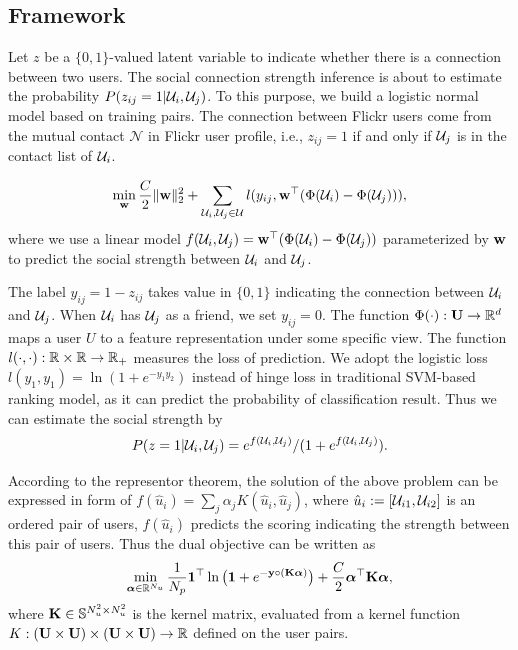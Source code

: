 \subsection{Framework}

Let $z$ be a $\{0, 1\}$-valued latent variable to indicate whether there is a connection between two users. The social connection strength inference is about to
estimate the probability $P(z_{ij}=1|{\cal U}_i, {\cal U}_j)$. To this purpose, we build a logistic normal model based on training pairs. The connection between Flickr
users come from the mutual contact $\mathcal N$ in Flickr user profile, i.e., $z_{ij}=1 $ if and only if ${\cal U}_j$ is in the contact list of ${\cal U}_i$.

\begin{eqnarray}
\min_{\w} \frac{C}{2}\| \w \|_2^2 + \sum_{\u_i, \u_j \in \mathcal U}l(y_{ij}, \w^\top(\Phi(\u_i) - \Phi(\u_j))), \label{eqn:primal-obj}
\end{eqnarray}
where we use a linear model $f({\cal U}_i, {\cal U}_j) = {\mathbf w}^\top(\Phi({\cal U}_i) - \Phi({\cal U}_j))$ parameterized by ${\mathbf w}$ to predict the social strength between ${\cal U}_i$ and ${\cal U}_j$.

The label $y_{ij} = 1 - z_{ij}$ takes value in $\{0, 1\}$ indicating the connection between ${\cal U}_i$ and ${\cal U}_j$. When ${\cal U}_i$ has ${\cal U}_j$ as a friend, we set
$y_{ij}= 0$. The function $\Phi(\cdot):{\bf U}\rightarrow{\mathbb R}^d$ maps a user $U$ to a feature representation under some specific view. The function $l(\cdot,
\cdot):{\mathbb R}\times{\mathbb R}\rightarrow{\mathbb R}_+$ measures the loss of prediction. We adopt the logistic loss $l(y_1, y_1) = \ln(1 + e^{-y_1y_2})$ instead of hinge loss in
traditional SVM-based ranking model, as it can predict the probability of classification result. Thus we can estimate the social strength by
 \[
P(z=1|{\cal U}_i, {\cal U}_j) = e^{f({\cal U}_i, {\cal U}_j)} / (1 + e^{f({\cal U}_i, {\cal U}_j)}).
 \]


According to the representor theorem\cite{colt/ScholkopfHS01}, the solution of the above problem can be expressed in form of $f(\hat{u}_i) =
\sum_j\alpha_jK(\hat{u}_i,\hat{u}_j)$, where $\hat{u}_i:= [{\cal U}_{i1}, {\cal U}_{i2}]$ is an ordered pair of users, $f(\hat{u}_i)$ predicts the scoring indicating the
strength between this pair of users. Thus the dual objective can be written as
\begin{eqnarray}
\min_{\ba\in\R^{N_u}} \frac{1}{N_p}\1^\top\ln\big(\1 + e^{-\y\circ(\K\ba)}\big) + \frac{C}{2}\ba^\top\K\ba, \label{eqn:dual-obj}
\end{eqnarray}
where ${\mathbf K}\in\mathbb S^{N_u^2\times N_u^2}$ is the kernel matrix, evaluated from a kernel function $K:({\bf U}\times{\bf U})\times({\bf U}\times{\bf U})\rightarrow{\mathbb R}$ defined on the
user pairs.


